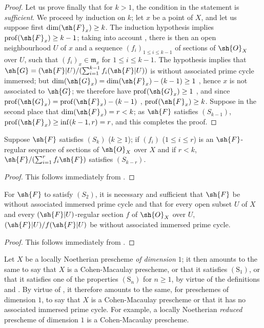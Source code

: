 \begin{proof}
Let us prove finally that for $k>1$, the condition in the statement is \emph{sufficient}.
We proceed by induction on $k$; let $x$ be a point of $X$, and let us suppose first $\dim(\sh{F}_x)\geq k$.
The induction hypothesis implies $\operatorname{prof}(\sh{F}_x)\geq k-1$; taking into account , there is then an open neighbourhood $U$ of $x$ and a sequence $(f_i)_{1\leq i\leq k-1}$ of sections of $\sh{O}_X$ over $U$, such that $(f_i)_x\in\mathfrak{m}_x$ for $1\leq i\leq k-1$.
The hypothesis implies that $\sh{G}=(\sh{F}|U)/(\sum_{i=1}^{k-1}f_i(\sh{F}|U))$ is without associated prime cycle immersed; but $\dim(\sh{G}_x)=\dim(\sh{F}_x)-(k-1)\geq 1$ , hence $x$ is not associated to $\sh{G}$; we therefore have $\operatorname{prof}(\sh{G}_x)\geq 1$ , and since $\operatorname{prof}(\sh{G}_x)=\operatorname{prof}(\sh{F}_x)-(k-1)$ , $\operatorname{prof}(\sh{F}_x)\geq k$.
Suppose in the second place that $\dim(\sh{F}_x)=r<k$; as $\sh{F}$ satisfies $(S_{k-1})$, $\operatorname{prof}(\sh{F}_x)\geq\inf(k-1,r)=r$, and this completes the proof.
\end{proof}

\begin{corollary}[5.7.6]
\label{IV.5.7.6}
Suppose $\sh{F}$ satisfies $(S_k)$ ($k\geq 1$); if $(f_i)$ ($1\leq i\leq r$) is an $\sh{F}$-regular sequence of sections of $\sh{O}_X$ over $X$ and if $r<k$, $\sh{F}/(\sum_{i=1}^r f_i\sh{F})$ satisfies $(S_{k-r})$.
\end{corollary}

\begin{proof}
This follows immediately from .
\end{proof}

\begin{corollary}[5.7.7]
\label{IV.5.7.7}
For $\sh{F}$ to satisfy $(S_2)$, it is necessary and sufficient that $\sh{F}$ be without associated immersed prime cycle and that for every open subset $U$ of $X$ and every $(\sh{F}|U)$-regular section $f$ of $\sh{O}_X$ over $U$, $(\sh{F}|U)/f(\sh{F}|U)$ be without associated immersed prime cycle.
\end{corollary}

\begin{proof}
This follows immediately from .
\end{proof}
\begin{remarks}[5.7.8]
\label{IV.5.7.8}
Let $X$ be a locally Noetherian prescheme \emph{of dimension} $1$;
it then amounts to the same to say that $X$ is a Cohen-Macaulay prescheme, or that it satisfies $(\mathrm{S}_1)$, or that it satisfies one of the properties $(\mathrm{S}_n)$ for $n\geqslant 1$, by virtue of the definitions  and .
By virtue of , it therefore amounts to the same, for preschemes of dimension $1$, to say that $X$ is a Cohen-Macaulay prescheme or that it has no associated immersed prime cycle.
For example, a locally Noetherian \emph{reduced} prescheme of dimension $1$ is a Cohen-Macaulay prescheme.
\end{remarks}

